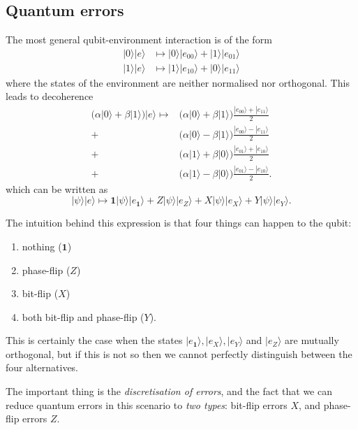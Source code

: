 \documentclass[fleqn,a4paper]{article}
\providecommand{\tightlist}{\setlength{\itemsep}{0pt}\setlength{\parskip}{0pt}}
\newenvironment{idea}{\everypar{\setlength{\parindent}{1.5em}}}{}
\theoremstyle{definition}
\theoremstyle{definition}
\theoremstyle{definition}
\theoremstyle{definition}
\theoremstyle{remark}
\begin{document}
\hypertarget{quantum-errors}{%
\subsection{Quantum errors}\label{quantum-errors}}

The most general qubit-environment interaction is of the form
\[
  \begin{aligned}
    |0\rangle|e\rangle &\longmapsto |0\rangle|e_{00}\rangle + |1\rangle|e_{01}\rangle
  \\|1\rangle|e\rangle &\longmapsto |1\rangle|e_{10}\rangle + |0\rangle|e_{11}\rangle
  \end{aligned}
\]
where the states of the environment are neither normalised nor orthogonal.
This leads to decoherence
\[
  \begin{aligned}
    \Big( \alpha|0\rangle + \beta|1\rangle \Big) |e\rangle \longmapsto
    & \Big( \alpha|0\rangle + \beta|1\rangle \Big) \frac{|e_{00}\rangle+|e_{11}\rangle}{2}
  \\+& \Big( \alpha|0\rangle - \beta|1\rangle \Big) \frac{|e_{00}\rangle-|e_{11}\rangle}{2}
  \\+& \Big( \alpha|1\rangle + \beta|0\rangle \Big) \frac{|e_{01}\rangle+|e_{10}\rangle}{2}
  \\+& \Big( \alpha|1\rangle - \beta|0\rangle \Big) \frac{|e_{01}\rangle-|e_{10}\rangle}{2}.
  \end{aligned}
\]
which can be written as
\[
|\psi\rangle|e\rangle \longmapsto  \mathbf{1}|\psi\rangle|e_{\mathbf{1}}\rangle + Z|\psi\rangle |e_Z\rangle +X|\psi\rangle |e_X\rangle + Y|\psi\rangle |e_Y\rangle.
\]

The intuition behind this expression is that four things can happen to the qubit:

\begin{enumerate}
\def\labelenumi{\arabic{enumi}.}
\tightlist
\item
  nothing (\(\mathbf{1}\))
\item
  phase-flip (\(Z\))
\item
  bit-flip (\(X\))
\item
  both bit-flip and phase-flip (\(Y\)).
\end{enumerate}

This is certainly the case when the states \(|e_{\mathbf{1}}\rangle, |e_X\rangle, |e_Y\rangle\) and \(|e_Z\rangle\) are mutually orthogonal, but if this is not so then we cannot perfectly distinguish between the four alternatives.

\begin{idea}
The important thing is the \emph{discretisation of errors}, and the fact that we can reduce quantum errors in this scenario to \emph{two types}: bit-flip errors \(X\), and phase-flip errors \(Z\).

\end{idea}
\end{document}
